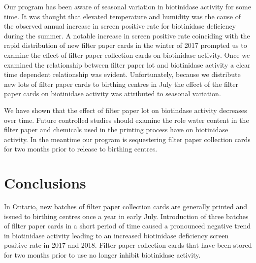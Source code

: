\documentclass[review]{elsarticle}
\begin{document}
Our program has been aware of seasonal variation in biotinidase
activity for some time. It was thought that elevated temperature and
humidity was the cause of the observed annual increase in screen
positive rate for biotinidase deficiency during the summer. A notable
increase in screen positive rate coinciding with the rapid
distribution of new filter paper cards in the winter of 2017 prompted
us to examine the effect of filter paper collection cards on
biotinidase activity. Once we examined the relationship between filter
paper lot and biotinidase activity a clear time dependent relationship
was evident. Unfortunately, because we distribute new lots of filter
paper cards to birthing centres in July the effect of the filter paper
cards on biotinidase activity was attributed to seasonal variation.

We have shown that the effect of filter paper lot on biotindase
activity decreases over time. Future controlled studies should examine
the role water content in the filter paper and chemicals used in the
printing process have on biotinidase activity. In the meantime our
program is sequestering filter paper collection cards for two months
prior to release to birthing centres.

\section*{Conclusions}
\label{sec:orgcb4bae7}
In Ontario, new batches of filter paper collection cards are generally
printed and issued to birthing centres once a year in early
July. Introduction of three batches of filter paper cards in a short
period of time caused a pronounced negative trend in biotinidase
activity leading to an increased biotinidase deficiency screen
positive rate in 2017 and 2018. Filter paper collection cards that
have been stored for two months prior to use no longer inhibit
biotinidase activity.
\end{document}
